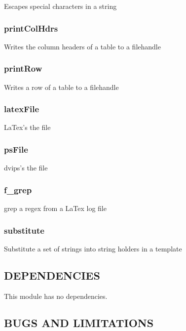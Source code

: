 \documentclass{article}
\begin{document}
Escapes special characters in a string

\subsubsection*{printColHdrs\label{Print_printColHdrs}}


Writes the column headers of a table to a filehandle

\subsubsection*{printRow\label{Print_printRow}}


Writes a row of a table to a filehandle

\subsubsection*{latexFile\label{Print_latexFile}}


LaTex's the file

\subsubsection*{psFile\label{Print_psFile}}


dvips's the file

\subsubsection*{f\_grep\label{Print_f_grep}}


grep a regex from a LaTex log file

\subsubsection*{substitute\label{Print_substitute}}


Substitute a set of strings into string holders in a template

\subsection*{DEPENDENCIES\label{Print_DEPENDENCIES}}


This module has no dependencies.

\subsection*{BUGS AND LIMITATIONS\label{Print_BUGS_AND_LIMITATIONS}}
\end{document}
